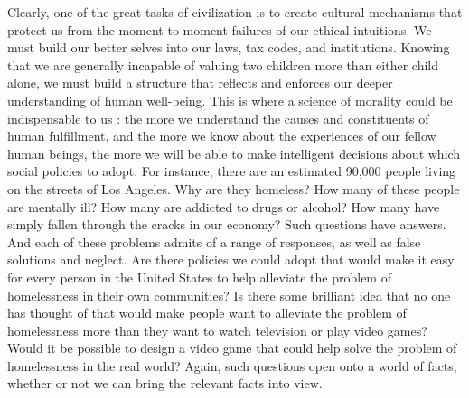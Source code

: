 \documentclass[a4paper,14pt]{extarticle}
\begin{document}
Clearly, one of the great tasks of civilization is to create cultural mechanisms that protect us from the moment-to-moment failures of our ethical intuitions.
We must build our better selves into our laws, tax codes, and institutions.
Knowing that we are generally incapable of valuing two children more than either child alone, we must build a structure that reflects and enforces our deeper understanding of human well-being.
This is where a science of morality could be indispensable to us :
the more we understand the causes and constituents of human fulfillment, and the more we know about the experiences of our fellow human beings, the more we will be able to make intelligent decisions about which social policies to adopt.
For instance, there are an estimated 90,000 people living on the streets of Los Angeles.
Why are they homeless?
How many of these people are mentally ill?
How many are addicted to drugs or alcohol?
How many have simply fallen through the cracks in our economy?
Such questions have answers.
And each of these problems admits of a range of responses, as well as false solutions and neglect.
Are there policies we could adopt that would make it easy for every person in the United States to help alleviate the problem of homelessness in their own communities?
Is there some brilliant idea that no one has thought of that would make people want to alleviate the problem of homelessness more than they want to watch television or play video games?
Would it be possible to design a video game that could help solve the problem of homelessness in the real world?
Again, such questions open onto a world of facts, whether or not we can bring the relevant facts into view.
\end{document}
